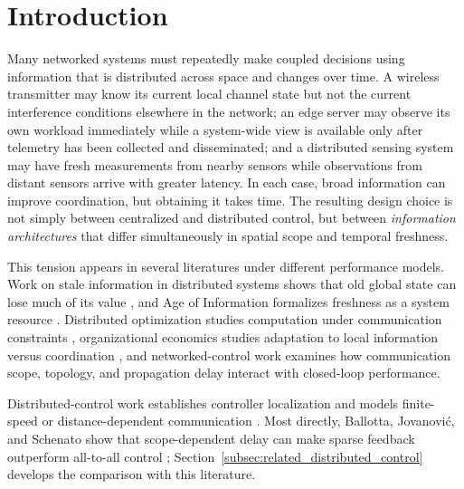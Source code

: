 \documentclass[11pt]{article}
\begin{document}
\section{Introduction}
\label{sec:introduction}

Many networked systems must repeatedly make coupled decisions using information
that is distributed across space and changes over time. A wireless transmitter
may know its current local channel state but not the current interference
conditions elsewhere in the network; an edge server may observe its own
workload immediately while a system-wide view is available only after telemetry
has been collected and disseminated; and a distributed sensing system may have
fresh measurements from nearby sensors while observations from distant sensors
arrive with greater latency. In each case, broad information can improve
coordination, but obtaining it takes time. The resulting design choice is not
simply between centralized and distributed control, but between
\emph{information architectures} that differ simultaneously in spatial scope
and temporal freshness.

This tension appears in several literatures under different performance
models. Work on stale information in distributed systems shows that old global
state can lose much of its value \cite{mitzenmacher2000old}, and Age of
Information formalizes freshness as a system resource \cite{kaul2012realtime}.
Distributed optimization studies computation under communication constraints
\cite{nedic2009distributed}, organizational economics studies adaptation to
local information versus coordination \cite{alonso2008coordination}, and
networked-control work examines how communication scope, topology, and
propagation delay interact with closed-loop performance.

Distributed-control work establishes controller localization and models
finite-speed or distance-dependent communication
\cite{bamieh2002spatial,voulgaris2003optimal,bamieh2005convex,
fardad2011finite}. Most directly, Ballotta, Jovanovi\'c, and Schenato show that
scope-dependent delay can make sparse feedback outperform all-to-all control
\cite{ballotta2023latency}; Section~\ref{subsec:related_distributed_control}
develops the comparison with this literature.
\end{document}
